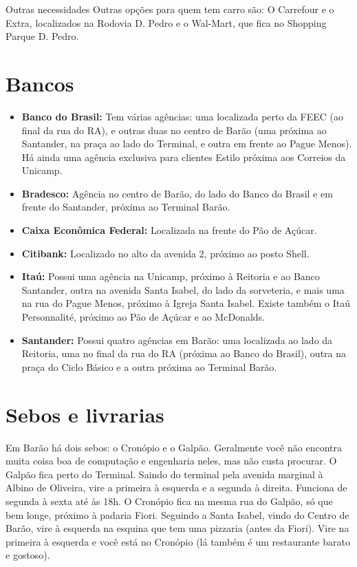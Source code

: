 \begin{story}{Outras necessidades}
Outras opções para quem tem carro são: O Carrefour e o Extra, localizados na Rodovia D. Pedro e o Wal-Mart, que fica no Shopping Parque D. Pedro.

\section*{Bancos}

\begin{itemize}


\item \textbf{Banco do Brasil:} Tem várias agências: uma localizada perto da FEEC (ao final da rua do RA), e outras duas no centro de Barão (uma próxima ao Santander, na praça ao lado do Terminal, e outra em frente ao Pague Menos). Há ainda uma agência exclusiva para clientes Estilo próxima aos Correios da Unicamp.

\item \textbf{Bradesco:} Agência no centro de Barão, do lado do Banco do Brasil e em frente do Santander, próxima ao Terminal Barão.

\item \textbf{Caixa Econômica Federal:} Localizada na frente do Pão de Açúcar.

\item  \textbf{Citibank:} Localizado no alto da avenida 2, próximo ao posto Shell.

\item \textbf{Itaú:} Possui uma agência na Unicamp, próximo à Reitoria e ao Banco Santander, outra na avenida Santa Isabel, do lado da sorveteria, e mais uma na rua do Pague Menos, próximo à Igreja Santa Isabel. Existe também o Itaú Personnalité, próximo ao Pão de Açúcar e ao McDonalds.

\item \textbf{Santander:} Possui quatro agências em Barão: uma localizada ao lado da Reitoria, uma no final da rua do RA (próxima ao Banco do Brasil), outra na praça do Ciclo Básico e a outra próxima ao Terminal Barão.
\end{itemize}

\section*{Sebos e livrarias}

Em Barão há dois sebos: o Cronópio e o Galpão. Geralmente você não encontra muita coisa boa de computação e engenharia neles, mas não custa procurar. O Galpão fica perto do Terminal. Saindo do terminal pela avenida marginal à Albino de Oliveira, vire a primeira à esquerda e a segunda à direita. Funciona de segunda à sexta até às 18h. O Cronópio fica na mesma rua do Galpão, só que bem longe, próximo à padaria Fiori. Seguindo a Santa Isabel, vindo do Centro de Barão, vire à esquerda na esquina que tem uma pizzaria (antes da Fiori). Vire na primeira à esquerda e você está no Cronópio (lá também é um restaurante barato e gostoso).


\end{story}
